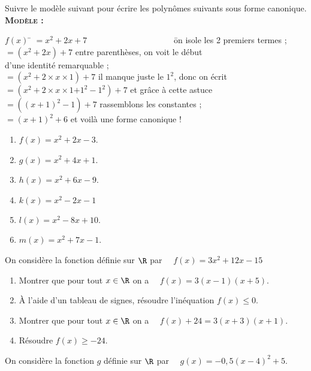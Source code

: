 \documentclass[a4paper,11pt,exos]{nsi} %
\begin{document}
\exo{}
Suivre le modèle suivant pour écrire les polynômes suivants sous forme canonique.\\
\textbf{\textsc{Modèle :}}
\begin{tabbing}
	$f(x)$	\=	$=x^2+2x+7\qquad\qquad\qquad\qquad\qquad$				\=	on isole les 2 premiers termes ;\\
	\>	$=\left(x^2+2x\right)+7$						\>	entre parenthèses, on voit le début \\
	\>													\>	d'une identité remarquable ;\\
	\>	$=\left(x^2+2\times x\times 1\right)+7$			\>	il manque juste le $1^2$, donc on écrit\\
	\>	$=\left(x^2+2\times x\times 1\boxed{+1^2-1^2}\right)+7$						\>	et grâce à cette astuce\\
	\>	$=\left((x+1)^2-1\right)+7$						\>	rassemblons les constantes ;\\
	\>	$=(x+1)^2+6$									\>	et voilà une forme canonique !
\end{tabbing}
\begin{multicols}{3}
	\begin{enumerate}[label=\textbullet]
		\item 	$f(x)=x^2+2x-3$.
		\item 	$g(x)=x^2+4x+1$.
		\item 	$h(x)=x^2+6x-9$.
		\item 	$k(x)=x^2-2x-1$
		\item	$l(x)=x^2-8x+10$.
		\item 	$m(x)=x^2+7x-1$.
	\end{enumerate}
\end{multicols}

On considère la fonction définie sur $\R$ par $\quad f(x)=3 x^2+12x-15$
\begin{enumerate}
	\item 	Montrer que pour tout $x\in\R$ on a $\quad f(x)=3(x-1)(x+5)$.
	\item 	À l'aide d'un tableau de signes, résoudre l'inéquation $f(x)\leq 0$.
	\item 	Montrer que pour tout $x\in\R$ on a $\quad f(x)+24 = 3(x+3)(x+1)$.
	\item	Résoudre $f(x)\geqslant -24$.
\end{enumerate}

On considère la fonction $g$ définie sur $\R$ par $\quad g(x)=-0,5(x-4)^2+5$.
\end{document}
